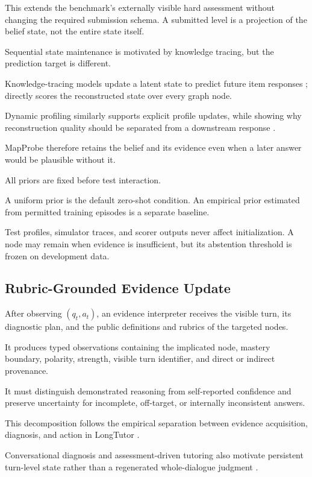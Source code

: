 This extends the benchmark's externally visible hard assessment without changing the required
submission schema. A submitted level is a projection of the belief state, not the entire state itself.

Sequential state maintenance is motivated by knowledge tracing, but the prediction target is different.

Knowledge-tracing models update a latent state to predict future item responses
\citep{piech2015dkt,liu2022pykt}; \knowact directly scores the reconstructed state over every graph
node.

Dynamic profiling similarly supports explicit profile updates, while showing why reconstruction
quality should be separated from a downstream response \citep{zhao2025rlpa}.

MapProbe therefore retains the belief and its evidence even when a later answer would be plausible
without it.

All priors are fixed before test interaction.

A uniform prior is the default zero-shot condition. An empirical prior estimated from permitted
training episodes is a separate baseline.

Test profiles, simulator traces, and scorer outputs never affect initialization. A node may remain
\unknown when evidence is insufficient, but its abstention threshold is frozen on development data.

\subsection{Rubric-Grounded Evidence Update}

After observing $(q_t,a_t)$, an evidence interpreter receives the visible turn, its diagnostic plan,
and the public definitions and rubrics of the targeted nodes.

It produces typed observations containing the implicated node, mastery boundary, polarity, strength,
visible turn identifier, and direct or indirect provenance.

It must distinguish demonstrated reasoning from self-reported confidence and preserve uncertainty for
incomplete, off-target, or internally inconsistent answers.

This decomposition follows the empirical separation between evidence acquisition, diagnosis, and
action in LongTutor \citep{li2026longtutor}.

Conversational diagnosis and assessment-driven tutoring also motivate persistent turn-level state
rather than a regenerated whole-dialogue judgment \citep{yao2026parld,li2026scaffoldlm}.

